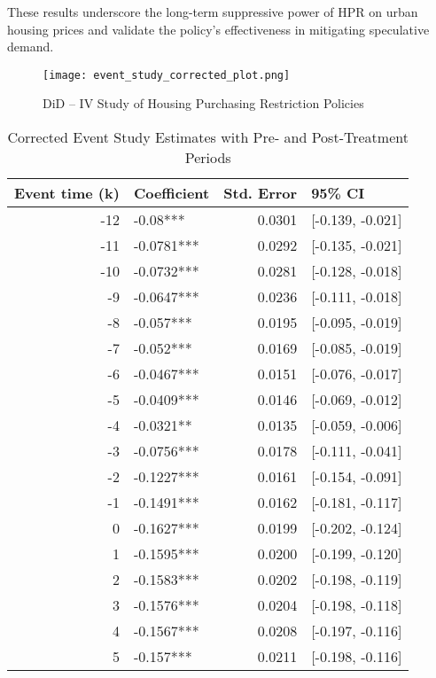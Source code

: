 \documentclass[12pt,english]{article}
\begin{document}
	These results underscore the long-term suppressive power of HPR on urban housing prices and validate the policy's effectiveness in mitigating speculative demand.
	\begin{figure}[H]
		\centering
		\texttt{[image: event\_study\_corrected\_plot.png]}
		\caption{DiD -- IV Study of Housing Purchasing Restriction Policies}
		
	\end{figure}
	
	
	\begin{table}[H]
		\centering
		\caption{Corrected Event Study Estimates with Pre- and Post-Treatment Periods}
		\label{tab:eventstudy_corrected}
		\begin{tabular}{rlrl}
			\toprule
			Event time (k) & Coefficient &  Std. Error &           95\% CI \\
			\midrule
			-12 &    -0.08*** &      0.0301 & [-0.139, -0.021] \\
			-11 &  -0.0781*** &      0.0292 & [-0.135, -0.021] \\
			-10 &  -0.0732*** &      0.0281 & [-0.128, -0.018] \\
			-9 &  -0.0647*** &      0.0236 & [-0.111, -0.018] \\
			-8 &   -0.057*** &      0.0195 & [-0.095, -0.019] \\
			-7 &   -0.052*** &      0.0169 & [-0.085, -0.019] \\
			-6 &  -0.0467*** &      0.0151 & [-0.076, -0.017] \\
			-5 &  -0.0409*** &      0.0146 & [-0.069, -0.012] \\
			-4 &   -0.0321** &      0.0135 & [-0.059, -0.006] \\
			-3 &  -0.0756*** &      0.0178 & [-0.111, -0.041] \\
			-2 &  -0.1227*** &      0.0161 & [-0.154, -0.091] \\
			-1 &  -0.1491*** &      0.0162 & [-0.181, -0.117] \\
			0 &  -0.1627*** &      0.0199 & [-0.202, -0.124] \\
			1 &  -0.1595*** &      0.0200 & [-0.199, -0.120] \\
			2 &  -0.1583*** &      0.0202 & [-0.198, -0.119] \\
			3 &  -0.1576*** &      0.0204 & [-0.198, -0.118] \\
			4 &  -0.1567*** &      0.0208 & [-0.197, -0.116] \\
			5 &   -0.157*** &      0.0211 & [-0.198, -0.116] \\

\end{tabular}
\end{table}
\end{document}
